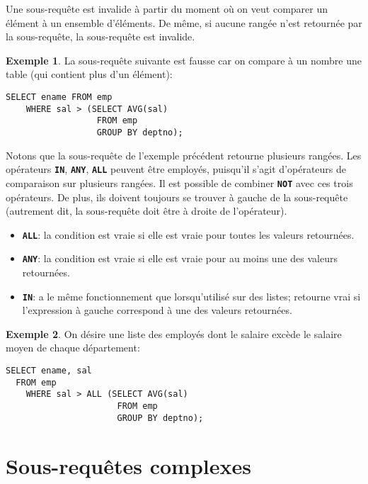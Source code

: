 \documentclass[a4paper, 12pt]{report}
\newcommand{\textSQL}[1]{\texttt{\textbf{#1}}}
\theoremstyle{definition} \newtheorem{ex}{Exemple}
\begin{document}
Une sous-requête est invalide à partir du moment où on veut comparer un élément à un ensemble d'éléments. De même, si aucune rangée n'est retournée par la sous-requête, la sous-requête est invalide.
\begin{ex}
	La sous-requête suivante est fausse car on compare à un nombre une table (qui contient plus d'un élément):
	\begin{lstlisting}[frame=single]
SELECT ename FROM emp
	WHERE sal > (SELECT AVG(sal)
		          FROM emp
		          GROUP BY deptno);
	\end{lstlisting}
\end{ex}
Notons que la sous-requête de l'exemple précédent retourne plusieurs rangées. Les opérateurs \textSQL{IN}, \textSQL{ANY}, \textSQL{ALL} peuvent être employés, puisqu'il s'agit d'opérateurs de comparaison sur plusieurs rangées. Il est possible de combiner \textSQL{NOT} avec ces trois opérateurs. De plus, ils doivent toujours se trouver à gauche de la sous-requête (autrement dit, la sous-requête doit être à droite de l'opérateur).
\begin{itemize}
	\item \textSQL{ALL}: la condition est vraie si elle est vraie pour toutes les valeurs retournées.
	\item \textSQL{ANY}: la condition est vraie si elle est vraie pour au moins une des valeurs retournées.
	\item \textSQL{IN}: a le même fonctionnement que lorsqu'utilisé sur des listes; retourne vrai si l'expression à gauche correspond à une des valeurs retournées.
\end{itemize}
\begin{ex}
  On désire une liste des employés dont le salaire excède le salaire moyen de chaque département:
	\begin{lstlisting}[frame=single]
SELECT ename, sal
  FROM emp
	WHERE sal > ALL (SELECT AVG(sal)
		              FROM emp
		              GROUP BY deptno);
	\end{lstlisting}
\end{ex}

\section{Sous-requêtes complexes}
\end{document}
